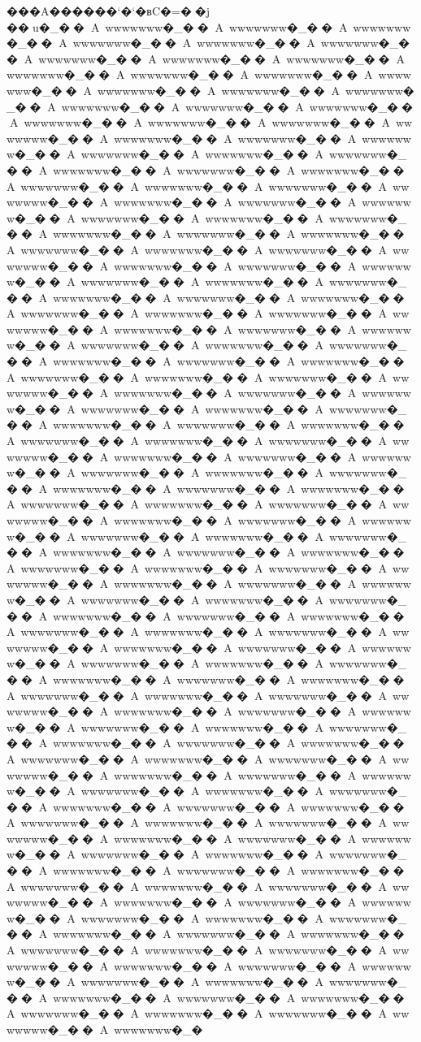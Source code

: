 {{{{���A������`�`�вC�=� �j	��u�_��A~wwwwwww�_��A~wwwwwww�_��A~wwwwwww�_��A~wwwwwww�_��A~wwwwwww�_��A~wwwwwww�_��A~wwwwwww�_��A~wwwwwww�_��A~wwwwwww�_��A~wwwwwww�_��A~wwwwwww�_��A~wwwwwww�_��A~wwwwwww�_��A~wwwwwww�_��A~wwwwwww�_��A~wwwwwww�_��A~wwwwwww�_��A~wwwwwww�_��A~wwwwwww�_��A~wwwwwww�_��A~wwwwwww�_��A~wwwwwww�_��A~wwwwwww�_��A~wwwwwww�_��A~wwwwwww�_��A~wwwwwww�_��A~wwwwwww�_��A~wwwwwww�_��A~wwwwwww�_��A~wwwwwww�_��A~wwwwwww�_��A~wwwwwww�_��A~wwwwwww�_��A~wwwwwww�_��A~wwwwwww�_��A~wwwwwww�_��A~wwwwwww�_��A~wwwwwww�_��A~wwwwwww�_��A~wwwwwww�_��A~wwwwwww�_��A~wwwwwww�_��A~wwwwwww�_��A~wwwwwww�_��A~wwwwwww�_��A~wwwwwww�_��A~wwwwwww�_��A~wwwwwww�_��A~wwwwwww�_��A~wwwwwww�_��A~wwwwwww�_��A~wwwwwww�_��A~wwwwwww�_��A~wwwwwww�_��A~wwwwwww�_��A~wwwwwww�_��A~wwwwwww�_��A~wwwwwww�_��A~wwwwwww�_��A~wwwwwww�_��A~wwwwwww�_��A~wwwwwww�_��A~wwwwwww�_��A~wwwwwww�_��A~wwwwwww�_��A~wwwwwww�_��A~wwwwwww�_��A~wwwwwww�_��A~wwwwwww�_��A~wwwwwww�_��A~wwwwwww�_��A~wwwwwww�_��A~wwwwwww�_��A~wwwwwww�_��A~wwwwwww�_��A~wwwwwww�_��A~wwwwwww�_��A~wwwwwww�_��A~wwwwwww�_��A~wwwwwww�_��A~wwwwwww�_��A~wwwwwww�_��A~wwwwwww�_��A~wwwwwww�_��A~wwwwwww�_��A~wwwwwww�_��A~wwwwwww�_��A~wwwwwww�_��A~wwwwwww�_��A~wwwwwww�_��A~wwwwwww�_��A~wwwwwww�_��A~wwwwwww�_��A~wwwwwww�_��A~wwwwwww�_��A~wwwwwww�_��A~wwwwwww�_��A~wwwwwww�_��A~wwwwwww�_��A~wwwwwww�_��A~wwwwwww�_��A~wwwwwww�_��A~wwwwwww�_��A~wwwwwww�_��A~wwwwwww�_��A~wwwwwww�_��A~wwwwwww�_��A~wwwwwww�_��A~wwwwwww�_��A~wwwwwww�_��A~wwwwwww�_��A~wwwwwww�_��A~wwwwwww�_��A~wwwwwww�_��A~wwwwwww�_��A~wwwwwww�_��A~wwwwwww�_��A~wwwwwww�_��A~wwwwwww�_��A~wwwwwww�_��A~wwwwwww�_��A~wwwwwww�_��A~wwwwwww�_��A~wwwwwww�_��A~wwwwwww�_��A~wwwwwww�_��A~wwwwwww�_��A~wwwwwww�_��A~wwwwwww�_��A~wwwwwww�_��A~wwwwwww�_��A~wwwwwww�_��A~wwwwwww�_��A~wwwwwww�_��A~wwwwwww�_��A~wwwwwww�_��A~wwwwwww�_��A~wwwwwww�_��A~wwwwwww�_��A~wwwwwww�_��A~wwwwwww�_��A~wwwwwww�_��A~wwwwwww�_��A~wwwwwww�_��A~wwwwwww�_��A~wwwwwww�_��A~wwwwwww�_��A~wwwwwww�_��A~wwwwwww�_��A~wwwwwww�_��A~wwwwwww�_��A~wwwwwww�_��A~wwwwwww�_��A~wwwwwww�_��A~wwwwwww�_��A~wwwwwww�_��A~wwwwwww�_��A~wwwwwww�_��A~wwwwwww�_��A~wwwwwww�_��A~wwwwwww�_��A~wwwwwww�_��A~wwwwwww�_��A~wwwwwww�_��A~wwwwwww�_��A~wwwwwww�_��A~wwwwwww�_��A~wwwwwww�_��A~wwwwwww�_��A~wwwwwww�_��A~wwwwwww�_��A~wwwwwww�_��A~wwwwwww�_��A~wwwwwww�_��A~wwwwwww�_��A~wwwwwww�_��A~wwwwwww�_��A~wwwwwww�_��A~wwwwwww�_��A~wwwwwww�_��A~wwwwwww�_��A~wwwwwww�_��A~wwwwwww�_��A~wwwwwww�_��A~wwwwwww�_��A~wwwwwww�_��A~wwwwwww�_��A~wwwwwww�_��A~wwwwwww�_��A~wwwwwww�_��A~wwwwwww�_��A~wwwwwww�_��A~wwwwwww�_��A~wwwwwww�_��A~wwwwwww�_��A~wwwwwww�_��A~wwwwwww�_��A~wwwwwww�_��A~wwwwwww�_��A~wwwwwww�_��A~wwwwwww�_��A~wwwwwww�_��A~wwwwwww�_��A~wwwwwww�_��A~wwwwwww�_��A~wwwwwww�_�}}}}
